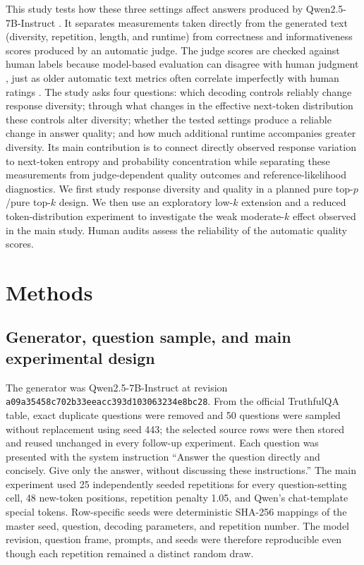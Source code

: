 \documentclass[11pt]{article}
\begin{document}
This study tests how these three settings affect answers produced by
Qwen2.5-7B-Instruct \cite{qwen25report}. It separates measurements taken
directly from the generated text (diversity, repetition, length, and runtime)
from correctness and informativeness scores produced by an automatic judge.
The judge scores are checked against human labels because model-based
evaluation can disagree with human judgment \cite{zheng2023judge}, just as
older automatic text metrics often correlate imperfectly with human ratings
\cite{liu2016evaluate}. The study asks four questions: which decoding controls
reliably change response diversity; through what changes in the effective
next-token distribution these controls alter diversity; whether the tested
settings produce a reliable change in answer quality; and how much additional
runtime accompanies greater diversity. Its main contribution is to connect
directly observed response variation to next-token entropy and probability
concentration while separating these measurements from judge-dependent quality
outcomes and reference-likelihood diagnostics. We first study response
diversity and quality in a planned pure top-$p$/pure top-$k$ design. We then use
an exploratory low-$k$ extension and a reduced token-distribution experiment to
investigate the weak moderate-$k$ effect observed in the main study. Human
audits assess the reliability of the automatic quality scores.

\section{Methods}

\subsection{Generator, question sample, and main experimental design}

The generator was Qwen2.5-7B-Instruct at revision
\texttt{a09a35458c702b33eeacc393d103063234e8bc28}. From the official TruthfulQA
table, exact duplicate questions were removed and 50 questions were sampled
without replacement using seed 443; the selected source rows were then stored
and reused unchanged in every follow-up experiment. Each question was presented
with the system instruction ``Answer the question directly and concisely. Give
only the answer, without discussing these instructions.'' The main experiment
used 25 independently seeded repetitions for every question-setting cell,
48 new-token positions, repetition penalty 1.05, and Qwen's chat-template
special tokens. Row-specific seeds were deterministic SHA-256 mappings of the
master seed, question, decoding parameters, and repetition number. The model
revision, question frame, prompts, and seeds were therefore reproducible even
though each repetition remained a distinct random draw.
\end{document}
